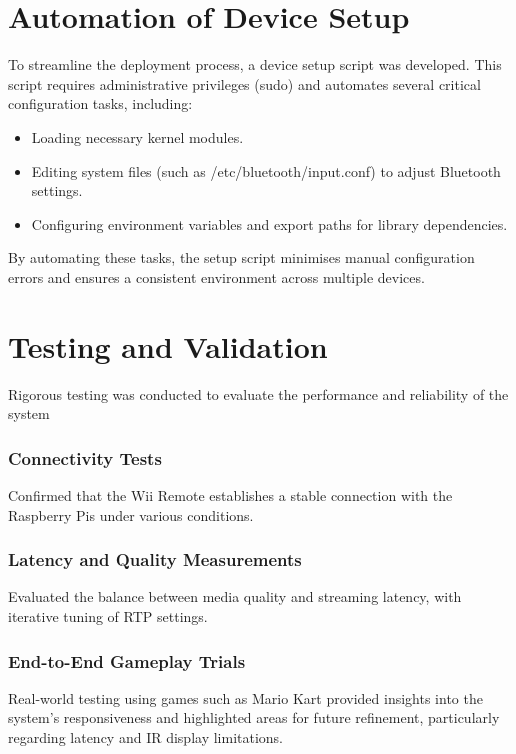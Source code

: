 \section{Automation of Device Setup}

To streamline the deployment process, a device setup script was developed. This script requires administrative privileges (sudo) and automates several critical configuration tasks, including:

\begin{itemize}

	\item Loading necessary kernel modules.
	\item Editing system files (such as /etc/bluetooth/input.conf) to adjust Bluetooth settings.
	\item Configuring environment variables and export paths for library dependencies.
\end{itemize}

By automating these tasks, the setup script minimises manual configuration errors and ensures a consistent environment across multiple devices.

\section{Testing and Validation}
Rigorous testing was conducted to evaluate the performance and reliability of the system

\subsubsection{Connectivity Tests}
Confirmed that the Wii Remote establishes a stable connection with the Raspberry Pis under various conditions.

\subsubsection{Latency and Quality Measurements}
Evaluated the balance between media quality and streaming latency, with iterative tuning of RTP settings.

\subsubsection{End-to-End Gameplay Trials}
Real-world testing using games such as Mario Kart provided insights into the system’s responsiveness and highlighted areas for future refinement, particularly regarding latency and IR display limitations.

